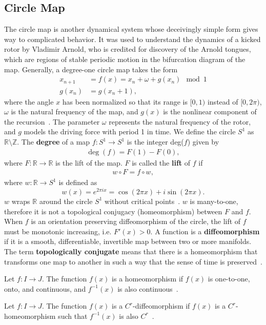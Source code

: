 \subsection{Circle Map}
The circle map is another
dynamical system whose deceivingly simple form gives way to complicated behavior. It was used to
understand the dynamics of a kicked rotor by Vladimir
Arnold, who is credited for discovery of the Arnold tongues, which are
regions of stable periodic motion in the bifurcation diagram of the
map. Generally, a degree-one circle map takes the form
\begin{align*}
x_{n+1}&=f(x)=x_n + \omega + g(x_n) \mod 1\\
g(x_n)&=g(x_n + 1),
\end{align*}
where the angle $x$ has been normalized so that its range is $[0,1)$
instead of $[0,2\pi )$, $\omega$ is the natural frequency of the map, and
$g(x)$ is the nonlinear component of the recursion~\cite{rasband}. The
parameter $\omega$ represents the natural frequency of the rotor, and
$g$ models the driving force with period 1 in time. We define the circle $S^1$ as $\mathbb{R} \setminus
\mathbb{Z}$. The \textbf{degree} of a map $f:S^1 \to S^1$ is the integer
deg($f$) given by 
\begin{align*}
\deg(f) = F(1) - F(0),
\end{align*}
where $F:\mathbb{R} \to \mathbb{R}$ is the lift of the
map. $F$ is called the \textbf{lift} of $f$ if
\begin{align*}
w \circ F = f \circ w,
\end{align*}
where $w:\mathbb{R} \to S^1$ is defined as
\begin{equation*}
w(x) = e^{2\pi i x} = \cos(2\pi x) + i\sin(2\pi x).
\end{equation*}
$w$ wraps $\mathbb{R}$ around the circle $S^1$ without critical
points~\cite{devaney}. $w$ is many-to-one, therefore it is not a
topological conjugacy (homeomorphism)
between $F$ and $f$. When $f$ is an orientation
preserving diffeomorphism of the circle, the lift of $f$ must be
monotonic increasing, i.e. $F'(x)>0$. A function is a \textbf{diffeomorphism}
if it is a smooth, differentiable, invertible map between two or more
manifolds. The term \textbf{topologically conjugate} means that there
is a homeomorphism that transforms one map to another in such a way that the sense of
time is preserved~\cite{strogatz}.

\begin{singlespacing}
\begin{definition}
Let $f:I \to J$. The function $f(x)$ is a homeomorphism if $f(x)$ is
one-to-one, onto, and continuous, and $f^{-1}(x)$ is also continuous~\cite{devaney}.
\end{definition}
\begin{definition}
Let $f:I\to J$. The function $f(x)$ is a $C^r$-diffeomorphism if
$f(x)$ is a $C^r$-homeomorphism such that $f^{-1}(x)$ is also $C^r$~\cite{devaney}. 
\end{definition}
\end{singlespacing}

